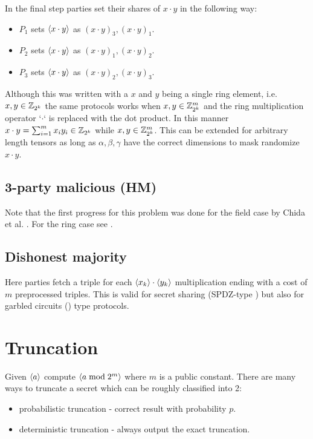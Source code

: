 \documentclass[11pt]{article}
\begin{document}
\noindent In the final step parties set their shares of $x \cdot y$ in the following way:
\begin{itemize}
    \item $P_1$ sets $\langle {x \cdot y} \rangle$ as $(x\cdot y)_3, (x \cdot y)_1$.
    \item $P_2$ sets $\langle {x \cdot y} \rangle$ as $(x\cdot y)_1, (x \cdot y)_2$.
    \item $P_3$ sets $\langle {x \cdot y} \rangle$ as $(x\cdot y)_2, (x \cdot y)_3$.
\end{itemize}

Although this was written with a $x$ and $y$ being a single ring element,
i.e. $x,y \in \mathbb{Z}_{2^k}$ the same protocols works when $x, y \in \mathbb{Z}^m_{2^k}$
and the ring multiplication operator `$\cdot$` is replaced with the dot
product. In this manner $x \cdot y = \sum_{i=1}^m x_i y_i \in \mathbb{Z}_{2^k}$ while
$x, y \in \mathbb{Z}^m_{2^k}$. This can be extended for arbitrary length tensors as long as
$\alpha, \beta, \gamma$ have the correct dimensions to mask randomize $x \cdot y$.

\subsection{3-party malicious (HM)}
Note that the first progress
for this problem was done for the field case by Chida et al. \cite{C:CGHIKL18}.
For the ring case see \cite{EPRINT:ADEN19,cryptoeprint:2020:1330}.

\subsection{Dishonest majority}

Here parties fetch a triple for each $\langle {x_k} \rangle \cdot \langle {y_k} \rangle$ multiplication
ending with a cost of $m$ preprocessed triples. This is valid for secret sharing (SPDZ-type
\cite{EC:KelPasRot18,C:DPSZ12,C:CDESX18})
but also for garbled circuits (\cite{AC:HazSchSor17,CCS:WanRanKat17b}) type protocols.

\section{Truncation}

Given $\langle {a} \rangle$ compute $\langle {a \bmod 2^m} \rangle$ where $m$ is a public constant.
There are many ways to truncate a secret which can be roughly classified into 2:
\begin{itemize}
  \item probabilistic truncation - correct result with probability $p$.
  \item deterministic truncation - always output the exact truncation.
\end{itemize}
\end{document}
